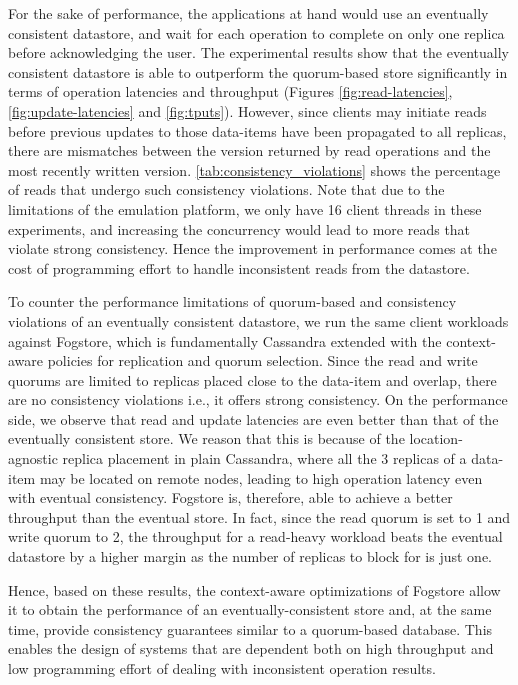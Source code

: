 \par For the sake of performance, the applications at hand would use an eventually consistent datastore, and wait for each operation to complete on only one replica before acknowledging the user. The experimental results show that the eventually consistent datastore is able to outperform the quorum-based store significantly in terms of operation latencies and throughput (Figures \ref{fig:read-latencies}, \ref{fig:update-latencies} and \ref{fig:tputs}). However, since clients may initiate reads before previous updates to those data-items have been propagated to all replicas, there are mismatches between the version returned by read operations and the most recently written version. \cref{tab:consistency_violations} shows the percentage of reads that undergo such consistency violations. Note that due to the limitations of the emulation platform, we only have 16 client threads in these experiments, and increasing the concurrency would lead to more reads that violate strong consistency. Hence the improvement in performance comes at the cost of programming effort to handle inconsistent reads from the datastore. 
\par To counter the performance limitations of quorum-based and consistency violations of an eventually consistent  datastore, we run the same client workloads against Fogstore, which is fundamentally Cassandra extended with the context-aware policies for replication and quorum selection. Since the read and write quorums are limited to replicas placed close to the data-item and overlap, there are no consistency violations i.e., it offers strong consistency. On the performance side, we observe that read and update latencies are even better than that of the eventually consistent store. We reason that this is because of the location-agnostic replica placement in plain Cassandra, where all the 3 replicas of a data-item may be located on remote nodes, leading to high operation latency even with eventual consistency. Fogstore is, therefore, able to achieve a better throughput than the eventual store. In fact, since the read quorum is set to 1 and write quorum to 2, the throughput for a read-heavy workload beats the eventual datastore by a higher margin as the number of replicas to block for is just one.

\par Hence, based on these results, the context-aware optimizations of Fogstore allow it to obtain the performance of an eventually-consistent store and, at the same time, provide consistency guarantees similar to a quorum-based database. This enables the design of systems that are dependent both on high throughput and low programming effort of dealing with inconsistent operation results.

